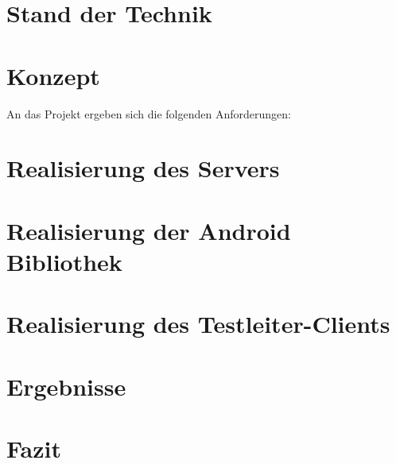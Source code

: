 \documentclass[12pt,a4paper,bibliography=totocnumbered,listof=totocnumbered]{scrartcl}
\begin{document}
\section{Stand der Technik}





\section{Konzept}

An das Projekt ergeben sich die folgenden Anforderungen:
\begin{compactitem}
	\item  
\end{compactitem}

\section{Realisierung des Servers}

\section{Realisierung der Android Bibliothek}
\section{Realisierung des Testleiter-Clients}


\section{Ergebnisse}

\section{Fazit}


\renewcommand\refname{Quellenverzeichnis}
\pagebreak
\printbibliography
\clearpage
{}
\setcounter{page}{1}
\end{document}
